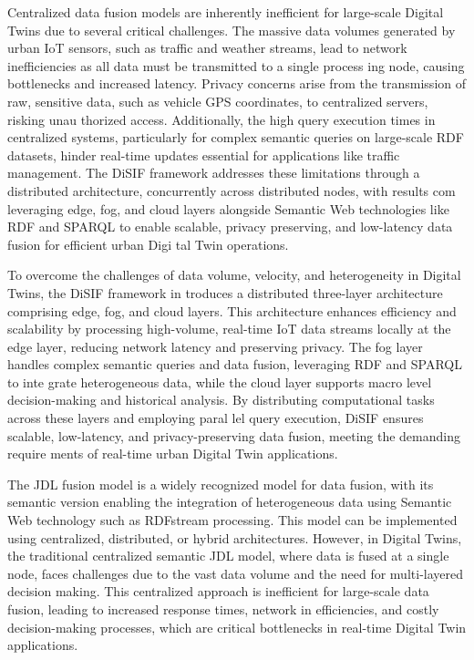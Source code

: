 \documentclass[5p,times]{elsarticle}
\begin{document}
    Centralized data fusion models are inherently inefficient
    for large-scale Digital Twins due to several critical
    challenges. The massive data volumes generated by urban IoT
    sensors, such as traffic and weather streams, lead to network
    inefficiencies as all data must be transmitted to a single process
   ing node, causing bottlenecks and increased latency. Privacy
    concerns arise from the transmission of raw, sensitive data, such
    as vehicle GPS coordinates, to centralized servers, risking unau
   thorized access. Additionally, the high query execution times in
    centralized systems, particularly for complex semantic queries
    on large-scale RDF datasets, hinder real-time updates essential
    for applications like traffic management. The DiSIF framework addresses these limitations through a distributed architecture,
    concurrently across distributed nodes, with results com
   leveraging edge, fog, and cloud layers alongside Semantic Web
    technologies like RDF and SPARQL to enable scalable, privacy
   preserving, and low-latency data fusion for efficient urban Digi
   tal Twin operations.

   To overcome the challenges of data volume, velocity, and
   heterogeneity in Digital Twins, the DiSIF framework in
  troduces a distributed three-layer architecture comprising edge,
   fog, and cloud layers. This architecture enhances efficiency
   and scalability by processing high-volume, real-time IoT data
   streams locally at the edge layer, reducing network latency and
   preserving privacy. The fog layer handles complex semantic
   queries and data fusion, leveraging RDF and SPARQL to inte
  grate heterogeneous data, while the cloud layer supports macro
  level decision-making and historical analysis. By distributing
   computational tasks across these layers and employing paral
  lel query execution, DiSIF ensures scalable, low-latency, and
   privacy-preserving data fusion, meeting the demanding require
  ments of real-time urban Digital Twin applications.


  The JDL fusion model is a widely recognized model for data
  fusion, with its semantic version \cite{noughabi2013semfus} enabling the integration
  of heterogeneous data using Semantic Web technology such as
  RDFstream processing. This model can be implemented using
  centralized, distributed, or hybrid architectures. However, in
  Digital Twins, the traditional centralized semantic JDL
  model, where data is fused at a single node, faces challenges due
  to the vast data volume and the need for multi-layered decision
 making. This centralized approach is inefficient for large-scale
  data fusion, leading to increased response times, network in
 efficiencies, and costly decision-making processes, which are
  critical bottlenecks in real-time Digital Twin applications.
\end{document}
